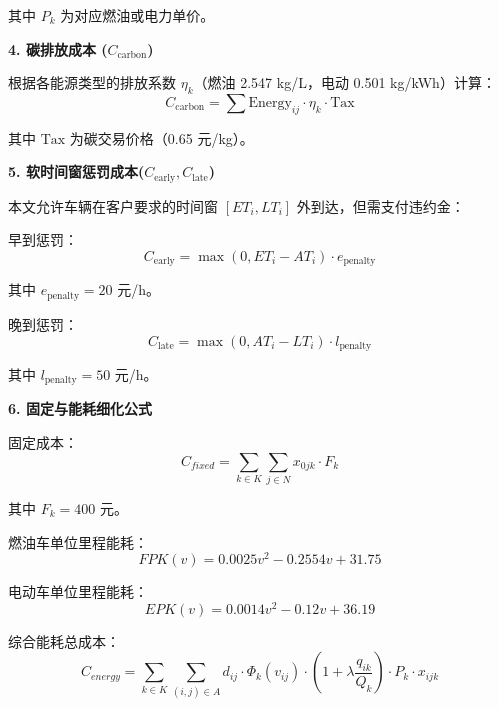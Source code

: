 \documentclass[12pt,a4paper]{article}
\begin{document}
其中 $P_k$ 为对应燃油或电力单价。

\textbf{4. 碳排放成本 ($C_{\text{carbon}}$)}

根据各能源类型的排放系数 $\eta_k$（燃油 2.547 kg/L，电动 0.501 kg/kWh）计算：
\[
C_{\text{carbon}} = \sum \text{Energy}_{ij} \cdot \eta_k \cdot \text{Tax}
\]

其中 $\text{Tax}$ 为碳交易价格（0.65 元/kg）。

\textbf{5. 软时间窗惩罚成本($C_{\text{early}}, C_{\text{late}}$)}

本文允许车辆在客户要求的时间窗 $[ET_i, LT_i]$ 外到达，但需支付违约金：

早到惩罚：
\[
C_{\text{early}} = \max(0, ET_i - AT_{i}) \cdot e_{\text{penalty}}
\]

其中 $e_{\text{penalty}} = 20$ 元/h。

晚到惩罚：
\[
C_{\text{late}} = \max(0, AT_{i} - LT_i) \cdot l_{\text{penalty}}
\]

其中 $l_{\text{penalty}} = 50$ 元/h。

\textbf{6. 固定与能耗细化公式}

固定成本：
\begin{equation}
C_{fixed} = \sum_{k \in K} \sum_{j \in N} x_{0jk} \cdot F_k
\end{equation}

其中 $F_k = 400$ 元。

燃油车单位里程能耗：
\begin{equation}
FPK(v) = 0.0025v^2 - 0.2554v + 31.75
\end{equation}

电动车单位里程能耗：
\begin{equation}
EPK(v) = 0.0014v^2 - 0.12v + 36.19
\end{equation}

综合能耗总成本：
\begin{equation}
C_{energy} = \sum_{k \in K} \sum_{(i,j) \in A} 
d_{ij} \cdot \Phi_k(v_{ij}) \cdot 
\left(1 + \lambda \frac{q_{ik}}{Q_k} \right) 
\cdot P_k \cdot x_{ijk}
\end{equation}
\end{document}
